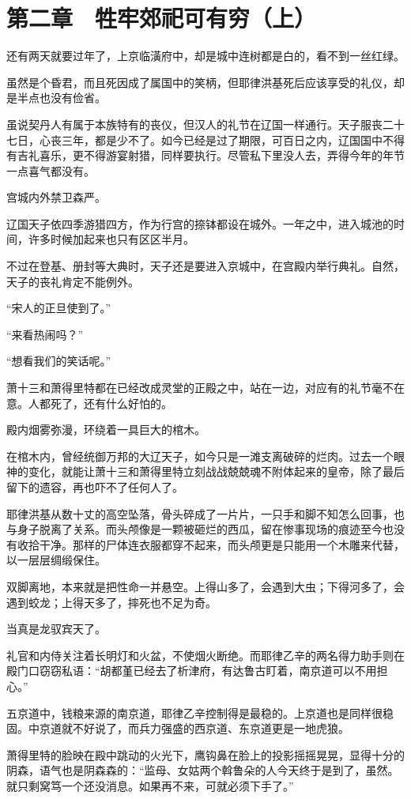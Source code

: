 \section{第二章　牲牢郊祀可有穷（上）}

还有两天就要过年了，上京临潢府中，却是城中连树都是白的，看不到一丝红绿。

虽然是个昏君，而且死因成了属国中的笑柄，但耶律洪基死后应该享受的礼仪，却是半点也没有俭省。

虽说契丹人有属于本族特有的丧仪，但汉人的礼节在辽国一样通行。天子服丧二十七日，心丧三年，都是少不了。如今已经是过了期限，可百日之内，辽国国中不得有吉礼喜乐，更不得游宴射猎，同样要执行。尽管私下里没人去，弄得今年的年节一点喜气都没有。

宫城内外禁卫森严。

辽国天子依四季游猎四方，作为行宫的捺钵都设在城外。一年之中，进入城池的时间，许多时候加起来也只有区区半月。

不过在登基、册封等大典时，天子还是要进入京城中，在宫殿内举行典礼。自然，天子的丧礼肯定不能例外。

“宋人的正旦使到了。”

“来看热闹吗？”

“想看我们的笑话呢。”

萧十三和萧得里特都在已经改成灵堂的正殿之中，站在一边，对应有的礼节毫不在意。人都死了，还有什么好怕的。

殿内烟雾弥漫，环绕着一具巨大的棺木。

在棺木内，曾经统御万邦的大辽天子，如今只是一滩支离破碎的烂肉。过去一个眼神的变化，就能让萧十三和萧得里特立刻战战兢兢魂不附体起来的皇帝，除了最后留下的遗容，再也吓不了任何人了。

耶律洪基从数十丈的高空坠落，骨头碎成了一片片，一只手和脚不知怎么回事，也与身子脱离了关系。而头颅像是一颗被砸烂的西瓜，留在惨事现场的痕迹至今也没有收拾干净。那样的尸体连衣服都穿不起来，而头颅更是只能用一个木雕来代替，以一层层绸缎保住。

双脚离地，本来就是把性命一并悬空。上得山多了，会遇到大虫；下得河多了，会遇到蛟龙；上得天多了，摔死也不足为奇。

当真是龙驭宾天了。

礼官和内侍关注着长明灯和火盆，不使烟火断绝。而耶律乙辛的两名得力助手则在殿门口窃窃私语：“胡都堇已经去了析津府，有达鲁古盯着，南京道可以不用担心。”

五京道中，钱粮来源的南京道，耶律乙辛控制得是最稳的。上京道也是同样很稳固。中京道就不好说了，而兵力强盛的西京道、东京道更是一地虎狼。

萧得里特的脸映在殿中跳动的火光下，鹰钩鼻在脸上的投影摇摇晃晃，显得十分的阴森，语气也是阴森森的：“监母、女姑两个斡鲁朵的人今天终于是到了，虽然。就只剩窝笃一个还没消息。如果再不来，可就必须下手了。”

